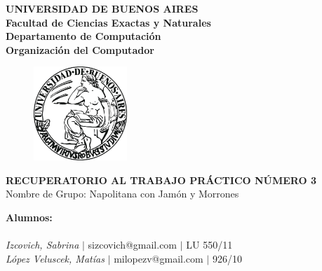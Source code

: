 \documentclass[10pt, a4paper]{article}
\begin{document}
\thispagestyle{empty}
\begin{center}

\Huge{ \bf{UNIVERSIDAD DE BUENOS AIRES}}
\\
\LARGE{\bf{Facultad de Ciencias Exactas y Naturales}}
\\
\textbf{Departamento de Computaci\'on}
\\
\textbf{Organizaci\'on del Computador}
\vspace{2.0\baselineskip}
\end{center}


\begin{figure}[h] %
\begin{center}
\includegraphics[width=100pt]{./image.jpeg}
\end{center}
\end{figure}
\begin{center}
\vspace*{0.7cm}

\huge{\bf RECUPERATORIO AL TRABAJO PR\'ACTICO N\'UMERO 3}\\
\huge{Nombre de Grupo: Napolitana con Jam\'on y Morrones}
\vspace*{8cm}

\end{center}

\huge{\textbf{Alumnos:}}\\
\\
\vspace*{0.3cm}
\Large{\textsl{Izcovich, Sabrina} $|$ sizcovich@gmail.com $|$ LU 550/11}\\
\vspace*{0.3cm}
\Large{\textsl{L\'opez Veluscek, Matías} \hspace{0.1cm}$|$ milopezv@gmail.com $|$ 926/10}\\

 
\newpage
\thispagestyle{empty}
\tableofcontents
\newpage
\end{document}
